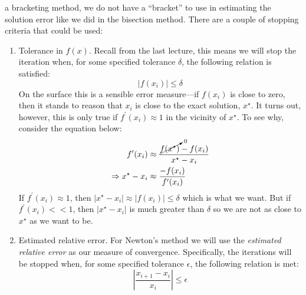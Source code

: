  a bracketing method, we do not have a ``bracket'' to use in estimating the solution error like we did in the bisection method.  There are a couple of stopping criteria that could be used:
\begin{enumerate}
\item Tolerance in $f(x)$.  Recall from the last lecture, this means we will stop the iteration when, for some specified tolerance $\delta$, the following relation is satisfied:
\begin{equation}
\left| f(x_i) \right| \le \delta
\end{equation}
On the surface this is a sensible error measure---if $f(x_i)$ is close to zero, then it stands to reason that $x_i$ is close to the exact solution, $x^{\star}$.  It turns out, however, this is only true if $f^{\prime}(x_i) \approx 1$ in the vicinity of $x^{\star}$.  To see why, consider the equation below:
\begin{align*}
f^{\prime}(x_i) &\approx \frac{\cancelto{0}{f(x^{\star})}-f(x_i)}{x^{\star}-x_i} \\
\Rightarrow x^{\star} - x_i &\approx \frac{-f(x_i)}{f^{\prime}(x_i)}
\end{align*}
If $f^{\prime}(x_i) \approx 1$, then $|x^{\star} - x_{i}| \approx |f(x_i)| \le \delta$ which is what we want.  But if $f^{\prime}(x_{i}) < < 1$, then $|x^{\star} - x_{i}|$ is much greater than $\delta$ so we are not as close to $x^{\star}$ as we want to be.

\item Estimated relative error.  For Newton's method we will use the \emph{estimated relative error} as our measure of convergence.  Specifically, the iterations will be stopped when, for some specified tolerance $\epsilon$, the following relation is met:
\begin{equation}
\left|\frac{x_{i+1} - x_i}{x_i} \right| \le \epsilon
\end{equation}

\end{enumerate}

